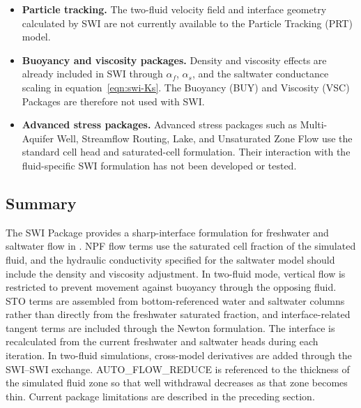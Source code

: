 \begin{itemize}
\item \textbf{Particle tracking.} The two-fluid velocity field and interface geometry calculated by SWI are not currently available to the Particle Tracking (PRT) model.

\item \textbf{Buoyancy and viscosity packages.} Density and viscosity effects are already included in SWI through $\alpha_{f}$, $\alpha_{s}$, and the saltwater conductance scaling in equation~\ref{eqn:swi-Ks}. The Buoyancy (BUY) and Viscosity (VSC) Packages are therefore not used with SWI.

\item \textbf{Advanced stress packages.} Advanced stress packages such as Multi-Aquifer Well, Streamflow Routing, Lake, and Unsaturated Zone Flow use the standard cell head and saturated-cell formulation. Their interaction with the fluid-specific SWI formulation has not been developed or tested.

\end{itemize}

\subsection{Summary}

The SWI Package provides a sharp-interface formulation for freshwater and saltwater flow in \mf. NPF flow terms use the saturated cell fraction of the simulated fluid, and the hydraulic conductivity specified for the saltwater model should include the density and viscosity adjustment. In two-fluid mode, vertical flow is restricted to prevent movement against buoyancy through the opposing fluid. STO terms are assembled from bottom-referenced water and saltwater columns rather than directly from the freshwater saturated fraction, and interface-related tangent terms are included through the Newton formulation. The interface is recalculated from the current freshwater and saltwater heads during each iteration. In two-fluid simulations, cross-model derivatives are added through the SWI--SWI exchange. AUTO\_FLOW\_REDUCE is referenced to the thickness of the simulated fluid zone so that well withdrawal decreases as that zone becomes thin. Current package limitations are described in the preceding section.
